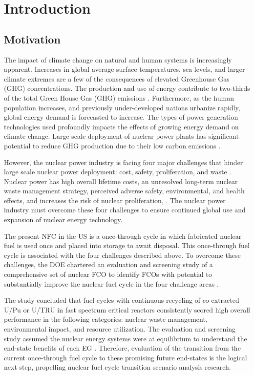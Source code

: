 \chapter[Introduction]{Introduction}
\label{chap:1}

\section{Motivation}
The impact of climate change on natural and human systems 
is increasingly apparent.
Increases in global average 
surface temperatures, sea levels, and larger climate extremes
are a few of the consequences of elevated Greenhouse Gas (GHG) 
concentrations.
The production and use of energy contribute to 
two-thirds of the total Green House Gas (GHG) 
emissions \cite{noauthor_climate_2018}.
Furthermore, as the human population increases, and previously 
under-developed nations urbanize rapidly, 
global energy demand is forecasted to increase.  
The types of power generation technologies used 
profoundly impacts the effects of growing energy demand 
on climate change.  
Large scale deployment of nuclear power plants has significant 
potential to reduce GHG production due to their low 
carbon emissions \cite{noauthor_climate_2018}.  

However, the nuclear power industry is facing four major challenges 
that hinder large scale nuclear power deployment: 
cost, safety, proliferation, and waste 
\cite{massachusetts_institute_of_technology_future_2003}. 
Nuclear power has high overall lifetime costs, an unresolved 
long-term nuclear waste management strategy, perceived adverse safety, 
environmental, and health effects, and increases the risk of nuclear proliferation,
\cite{massachusetts_institute_of_technology_future_2003}. 
The nuclear power industry must overcome these four challenges 
to ensure continued global use and expansion 
of nuclear energy technology. 

The present \gls{NFC} in the \gls{US} is a once-through cycle 
in which fabricated nuclear fuel is used once and placed into 
storage to await disposal. 
This once-through fuel cycle is associated with the four
challenges described above.
To overcome these challenges, the \gls{DOE} chartered an evaluation 
and screening study of a comprehensive set of nuclear \gls{FCO} 
to identify \glspl{FCO} with potential to substantially 
improve the nuclear fuel cycle in the four challenge areas
\cite{wigeland_nuclear_2014}. 

The study concluded that fuel cycles with continuous recycling
of co-extracted U/Pu or U/TRU in fast spectrum critical reactors
consistently scored high overall performance in the following 
categories: nuclear waste management, environmental impact, 
and resource utilization. 
The evaluation and screening study assumed
the nuclear energy systems were at equilibrium to understand 
the end-state benefits of each \gls{EG} \cite{feng_standardized_2016}. 
Therefore, evaluation of the transition from the current 
once-through fuel cycle to these promising 
future end-states \cite{feng_standardized_2016} 
is the logical next step, propelling 
nuclear fuel cycle transition 
scenario analysis research. 

